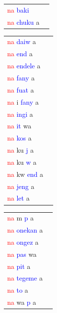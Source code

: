 \documentclass[output=paper,colorlinks,citecolor=brown]{langscibook}
\begin{document}
\begin{table}
\begin{minipage}[t]{.24\textwidth}
\begin{tabular}{ll}
\textcolor{red}{na} \textcolor{blue}{baki} \\ 
\textcolor{red}{na} \textcolor{blue}{chuku} a \\ 
\end{tabular}
\end{minipage}
\begin{minipage}[t]{.24\textwidth}
\begin{tabular}{ll}
\textcolor{red}{na} \textcolor{blue}{daiw} a \\ 
\textcolor{red}{na} \textcolor{blue}{end} a \\ 
\textcolor{red}{na} \textcolor{blue}{endele} a \\ 
\textcolor{red}{na} \textcolor{blue}{fany} a \\ 
\textcolor{red}{na} \textcolor{blue}{fuat} a \\ 
\textcolor{red}{na} i \textcolor{blue}{fany} a \\ 
\textcolor{red}{na} \textcolor{blue}{ingi} a \\ 
\textcolor{red}{na} \textcolor{blue}{it} wa \\  
\textcolor{red}{na} \textcolor{blue}{kos} a \\ 
\textcolor{red}{na} ku \textcolor{blue}{j} a \\ 
\textcolor{red}{na} ku \textcolor{blue}{w} a \\  
\textcolor{red}{na} kw \textcolor{blue}{end} a \\ 
\textcolor{red}{na} \textcolor{blue}{jeng} a \\ 
\textcolor{red}{na} \textcolor{blue}{let} a \\ 
\end{tabular}
\end{minipage}
\begin{minipage}[t]{.24\textwidth}
\begin{tabular}{ll}
\textcolor{red}{na} m \textcolor{blue}{p} a \\ 
\textcolor{red}{na} \textcolor{blue}{onekan} a \\ 
\textcolor{red}{na} \textcolor{blue}{ongez} a \\ 
\textcolor{red}{na} \textcolor{blue}{pas} wa \\ 
\textcolor{red}{na} \textcolor{blue}{pit} a \\ 
\textcolor{red}{na} \textcolor{blue}{tegeme} a \\ 
\textcolor{red}{na} \textcolor{blue}{to} a \\ 
\textcolor{red}{na} wa \textcolor{blue}{p} a \\ 

\end{tabular}
\end{minipage}
\end{table}
\end{document}
